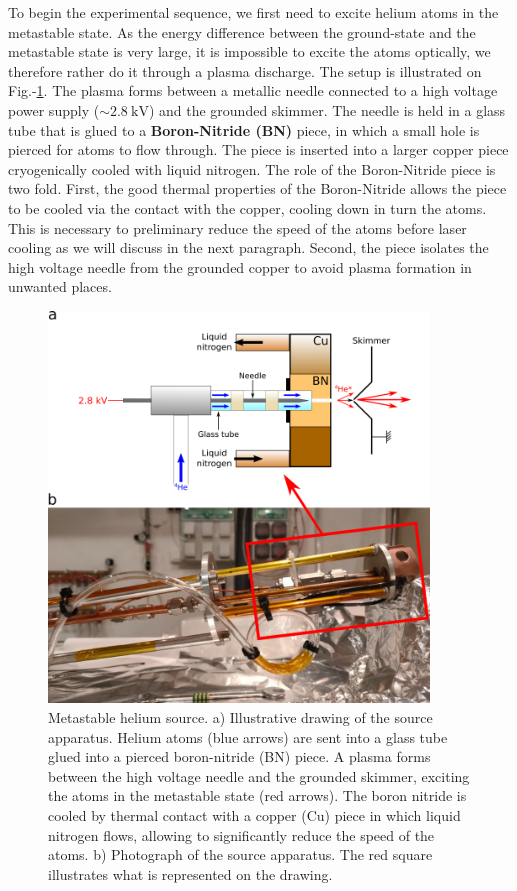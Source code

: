 To begin the experimental sequence, we first need to excite helium atoms in the metastable state. As the energy difference between the ground-state and the metastable state is very large, it is impossible to excite the atoms optically, we therefore rather do it through a plasma discharge. The setup is illustrated on Fig.-\ref{fig:source}. The plasma forms between a metallic needle connected to a high voltage power supply ($\sim 2.8 \ \mathrm{kV}$) and the grounded skimmer. The needle is held in a glass tube that is glued to a \textbf{Boron-Nitride (BN)} piece, in which a small hole is pierced for atoms to flow through. The piece is inserted into a larger copper piece cryogenically cooled with liquid nitrogen. The role of the Boron-Nitride piece is two fold. First, the good thermal properties of the Boron-Nitride allows the piece to be cooled via the contact with the copper, cooling down in turn the atoms. This is necessary to preliminary reduce the speed of the atoms before laser cooling as we will discuss in the next paragraph. Second, the piece isolates the high voltage needle from the grounded copper to avoid plasma formation in unwanted places.

\begin{figure}
    \centering
    \includegraphics[width=0.9\textwidth]{Fig/Chapter3/source.png}
    \caption{Metastable helium source. a) Illustrative drawing of the source apparatus. Helium atoms (blue arrows) are sent into a glass tube glued into a pierced boron-nitride (BN) piece. A plasma forms between the high voltage needle and the grounded skimmer, exciting the atoms in the metastable state (red arrows). The boron nitride is cooled by thermal contact with a copper (Cu) piece in which liquid nitrogen flows, allowing to significantly reduce the speed of the atoms. b) Photograph of the source apparatus. The red square illustrates what is represented on the drawing.}
    \label{fig:source}
\end{figure}


